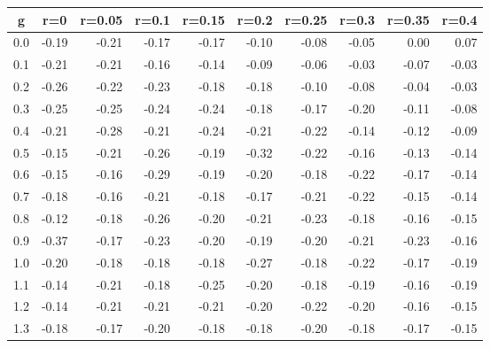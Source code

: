 %
\begin{table}[!tbp]
 \begin{center}
 \begin{tabular}{rrrrrrrrrr}\hline\hline
\multicolumn{1}{c}{g}&\multicolumn{1}{c}{r=0}&\multicolumn{1}{c}{r=0.05}&\multicolumn{1}{c}{r=0.1}&\multicolumn{1}{c}{r=0.15}&\multicolumn{1}{c}{r=0.2}&\multicolumn{1}{c}{r=0.25}&\multicolumn{1}{c}{r=0.3}&\multicolumn{1}{c}{r=0.35}&\multicolumn{1}{c}{r=0.4}\tabularnewline
\hline
0.0&-0.19&-0.21&-0.17&-0.17&-0.10&-0.08&-0.05& 0.00& 0.07\tabularnewline
0.1&-0.21&-0.21&-0.16&-0.14&-0.09&-0.06&-0.03&-0.07&-0.03\tabularnewline
0.2&-0.26&-0.22&-0.23&-0.18&-0.18&-0.10&-0.08&-0.04&-0.03\tabularnewline
0.3&-0.25&-0.25&-0.24&-0.24&-0.18&-0.17&-0.20&-0.11&-0.08\tabularnewline
0.4&-0.21&-0.28&-0.21&-0.24&-0.21&-0.22&-0.14&-0.12&-0.09\tabularnewline
0.5&-0.15&-0.21&-0.26&-0.19&-0.32&-0.22&-0.16&-0.13&-0.14\tabularnewline
0.6&-0.15&-0.16&-0.29&-0.19&-0.20&-0.18&-0.22&-0.17&-0.14\tabularnewline
0.7&-0.18&-0.16&-0.21&-0.18&-0.17&-0.21&-0.22&-0.15&-0.14\tabularnewline
0.8&-0.12&-0.18&-0.26&-0.20&-0.21&-0.23&-0.18&-0.16&-0.15\tabularnewline
0.9&-0.37&-0.17&-0.23&-0.20&-0.19&-0.20&-0.21&-0.23&-0.16\tabularnewline
1.0&-0.20&-0.18&-0.18&-0.18&-0.27&-0.18&-0.22&-0.17&-0.19\tabularnewline
1.1&-0.14&-0.21&-0.18&-0.25&-0.20&-0.18&-0.19&-0.16&-0.19\tabularnewline
1.2&-0.14&-0.21&-0.21&-0.21&-0.20&-0.22&-0.20&-0.16&-0.15\tabularnewline
1.3&-0.18&-0.17&-0.20&-0.18&-0.18&-0.20&-0.18&-0.17&-0.15\tabularnewline
\hline
\end{tabular}

\end{center}

\end{table}

